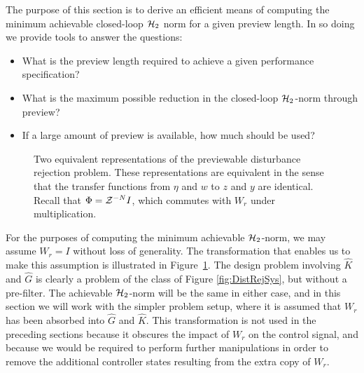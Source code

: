 \label{sec:2norm}
The purpose of this section is to derive an efficient means of computing the minimum achievable closed-loop $\mathcal H_2$ norm for a given preview length. In so doing we provide tools to answer the questions: 
\begin{itemize}
\item What is the preview length required to achieve a given performance specification?
\item What is the maximum possible reduction in the closed-loop $\mathcal H_2$-norm through preview?
\item If a large amount of preview is available, how much should be used?
\end{itemize}


\begin{figure}
\begin{center}
\stdcontrolfrags
{}
\end{center}
\caption{Two equivalent representations of the previewable disturbance rejection problem. These representations are equivalent in the sense that the transfer functions from $\eta$ and $w$ to $z$ and $y$ are identical. Recall that $\Phi=\mathcal{Z}^{-N}I$, which commutes with $W_r$ under multiplication. \label{fig:AbsorbWr}}
\end{figure}

For the purposes of computing the minimum achievable $\mathcal H_2$-norm, we may assume $W_r=I$ without loss of generality. The transformation that enables us to make this assumption is illustrated in Figure~\ref{fig:AbsorbWr}. The design problem involving $\hat K$ and $\hat G$ is clearly a problem of the class of Figure \ref{fig:DistRejSys}, but without a pre-filter. The achievable $\mathcal H_2$-norm will be the same in either case, and in this section we will work with the simpler problem setup, where it is assumed that $W_r$ has been absorbed into $\hat G$ and $\hat K$. This transformation is not used in the preceding sections because it obscures the impact of $W_r$ on the control signal, and because we would be required to perform further manipulations in order to remove the additional controller states resulting from the extra copy of $W_r$. 

